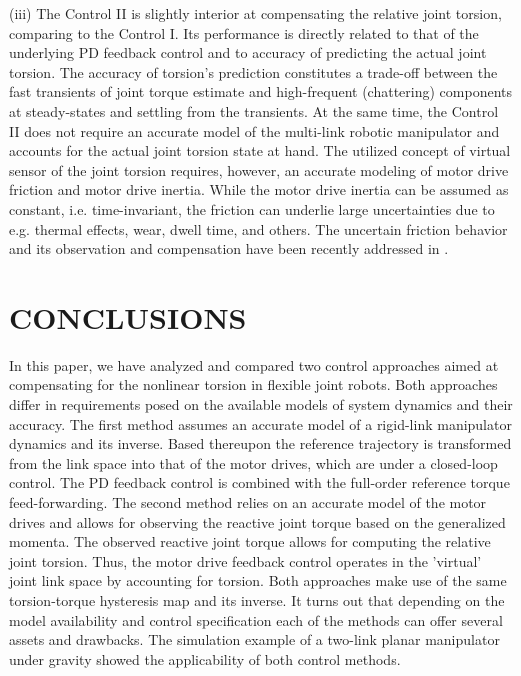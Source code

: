 \documentclass[a4paper, 10pt, conference]{ieeeconf}
\begin{document}
(iii) The Control II is slightly interior at compensating the
relative joint torsion, comparing to the Control I. Its
performance is directly related to that of the underlying PD
feedback control and to accuracy of predicting the actual joint
torsion. The accuracy of torsion's prediction constitutes a
trade-off between the fast transients of joint torque estimate and
high-frequent (chattering) components at steady-states and
settling from the transients. At the same time, the Control II
does not require an accurate model of the multi-link robotic
manipulator and accounts for the actual joint torsion state at
hand. The utilized concept of virtual sensor of the joint torsion
requires, however, an accurate modeling of motor drive friction
and motor drive inertia. While the motor drive inertia can be
assumed as constant, i.e. time-invariant, the friction can
underlie large uncertainties due to e.g. thermal effects, wear,
dwell time, and others. The uncertain friction behavior and its
observation and compensation have been recently addressed in
\cite{Ruder2015f}.




\section{CONCLUSIONS}
\label{sec:6}


In this paper, we have analyzed and compared two control
approaches aimed at compensating for the nonlinear torsion in
flexible joint robots. Both approaches differ in requirements
posed on the available models of system dynamics and their
accuracy. The first method assumes an accurate model of a
rigid-link manipulator dynamics and its inverse. Based thereupon
the reference trajectory is transformed from the link space into
that of the motor drives, which are under a closed-loop control.
The PD feedback control is combined with the full-order reference
torque feed-forwarding. The second method relies on an accurate
model of the motor drives and allows for observing the reactive
joint torque based on the generalized momenta. The observed
reactive joint torque allows for computing the relative joint
torsion. Thus, the motor drive feedback control operates in the
'virtual' joint link space by accounting for torsion. Both
approaches make use of the same torsion-torque hysteresis map and
its inverse. It turns out that depending on the model availability
and control specification each of the methods can offer several
assets and drawbacks. The simulation example of a two-link planar
manipulator under gravity showed the applicability of both control
methods.









\end{document}
